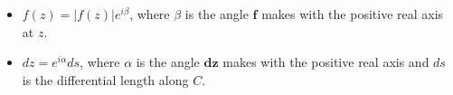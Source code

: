 \documentclass[preview]{standalone}
\begin{document}
\begin{center}
\begin{itemize}\item $f(z) = |f(z)|e^{i\beta}$, where $\beta$ is the angle $\mathbf{f}$ makes with the positive real axis at $z$.\item $dz = e^{i\alpha}ds$, where $\alpha$ is the angle $\mathbf{dz}$ makes with the positive real axis and $ds$ is the differential length along $C$.\end{itemize}
\end{center}
\end{document}
